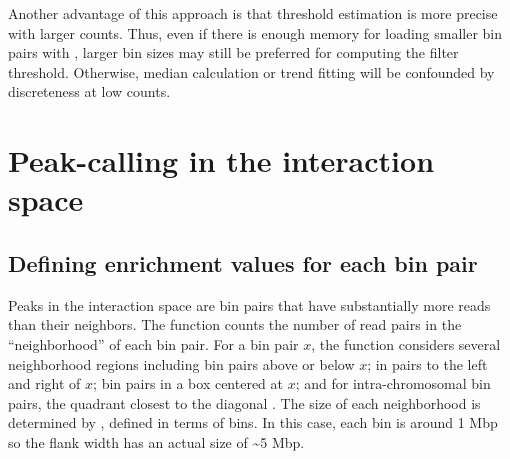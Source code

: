 \documentclass{report}\usepackage[]{graphicx}\usepackage[usenames,dvipsnames]{color}
\newcommand{\hlopt}[1]{\textcolor[rgb]{0,0,0}{#1}}%
\newcommand{\hlstd}[1]{\textcolor[rgb]{0.251,0.251,0.251}{#1}}%
\newcommand{\hlkwb}[1]{\textcolor[rgb]{0,0,0}{#1}}%
\newcommand{\hlkwc}[1]{\textcolor[rgb]{0.251,0.251,0.251}{#1}}%
\newcommand{\hlkwd}[1]{\textcolor[rgb]{0.878,0.439,0.125}{#1}}%
\newenvironment{knitrout}{}{} %
\begin{document}
\begin{knitrout}
\color{fgcolor}
\end{knitrout}

Another advantage of this approach is that threshold estimation is more precise with larger counts.
Thus, even if there is enough memory for loading smaller bin pairs with , larger bin sizes may still be preferred for computing the filter threshold.
Otherwise, median calculation or trend fitting will be confounded by discreteness at low counts.

\section{Peak-calling in the interaction space}

\subsection{Defining enrichment values for each bin pair}
Peaks in the interaction space are bin pairs that have substantially more reads than their neighbors.
The  function counts the number of read pairs in the ``neighborhood'' of each bin pair.
For a bin pair $x$, the function considers several neighborhood regions including bin pairs above or below $x$; in pairs to the left and right of $x$; bin pairs in a box centered at $x$; and for intra-chromosomal bin pairs, the quadrant closest to the diagonal \cite{rao2014kilobase}.
The size of each neighborhood is determined by , defined in terms of bins.
In this case, each bin is around 1 Mbp so the flank width has an actual size of \textasciitilde{}5 Mbp.
\end{document}
